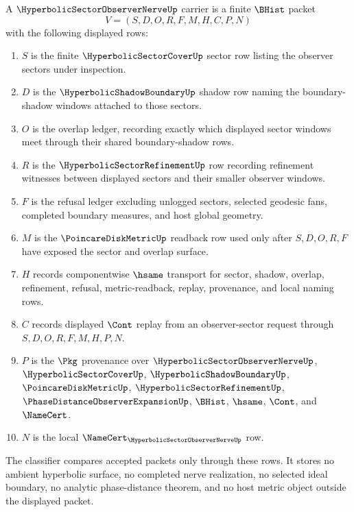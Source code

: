 \begin{definition}
\label{def:hyperbolic-sector-observer-nerve-carrier}
A $\HyperbolicSectorObserverNerveUp$ carrier is a finite $\BHist$ packet
$$
V=(S,D,O,R,F,M,H,C,P,N)
$$
with the following displayed rows:
\begin{enumerate}
\item $S$ is the finite $\HyperbolicSectorCoverUp$ sector row listing the observer sectors under inspection.
\item $D$ is the $\HyperbolicShadowBoundaryUp$ shadow row naming the boundary-shadow windows attached to those sectors.
\item $O$ is the overlap ledger, recording exactly which displayed sector windows meet through their shared boundary-shadow rows.
\item $R$ is the $\HyperbolicSectorRefinementUp$ row recording refinement witnesses between displayed sectors and their smaller observer windows.
\item $F$ is the refusal ledger excluding unlogged sectors, selected geodesic fans, completed boundary measures, and host global geometry.
\item $M$ is the $\PoincareDiskMetricUp$ readback row used only after $S,D,O,R,F$ have exposed the sector and overlap surface.
\item $H$ records componentwise $\hsame$ transport for sector, shadow, overlap, refinement, refusal, metric-readback, replay, provenance, and local naming rows.
\item $C$ records displayed $\Cont$ replay from an observer-sector request through $S,D,O,R,F,M,H,P,N$.
\item $P$ is the $\Pkg$ provenance over $\HyperbolicSectorObserverNerveUp$, $\HyperbolicSectorCoverUp$, $\HyperbolicShadowBoundaryUp$, $\PoincareDiskMetricUp$, $\HyperbolicSectorRefinementUp$, $\PhaseDistanceObserverExpansionUp$, $\BHist$, $\hsame$, $\Cont$, and $\NameCert$.
\item $N$ is the local $\NameCert_{\HyperbolicSectorObserverNerveUp}$ row.
\end{enumerate}
The classifier compares accepted packets only through these rows. It stores no ambient hyperbolic surface, no completed nerve realization, no selected ideal boundary, no analytic phase-distance theorem, and no host metric object outside the displayed packet.
\end{definition}


